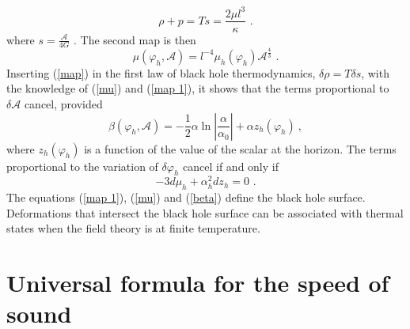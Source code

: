 \documentclass[11pt,epsf,letterpaper]{article}%
\begin{document}
\begin{equation}
\rho+p=Ts=\frac{2\mu l^{3}}{\kappa}\text{ .}%
\end{equation}
where $s=\frac{\mathcal{A}}{4G}$ . The second map is then%
\begin{equation}
\mu\left(  \varphi_{h},\mathcal{A}\right)  =l^{-4}\mu_{h}\left(  \varphi
_{h}\right)  \mathcal{A}^{\frac{4}{3}}\text{ .} \label{mu}%
\end{equation}
Inserting (\ref{map}) in the first law of black hole thermodynamics,
$\delta\rho=T\delta s$, with the knowledge of (\ref{mu}) and (\ref{map 1}), it
shows that the terms proportional to $\delta\mathcal{A}$ cancel, provided
\begin{equation}
\beta\left(  \varphi_{h},\mathcal{A}\right)  =-\frac{1}{2}\alpha\ln\left\vert
\frac{\alpha}{\alpha_{0}}\right\vert +\alpha z_{h}\left(  \varphi_{h}\right)
~, \label{beta}%
\end{equation}
where $z_{h}(\varphi_{h})$ is a function of the value of the scalar at the
horizon. The terms proportional to the variation of $\delta\varphi_{h}$ cancel
if and only if
\begin{equation}
-3d\mu_{h}+\alpha_{h}^{2}dz_{h}=0\text{ .} \label{mu0}%
\end{equation}
The equations (\ref{map 1}), (\ref{mu}) and (\ref{beta}) define the black hole
surface. Deformations that intersect the black hole surface can be associated
with thermal states when the field theory is at finite temperature.

\section{Universal formula for the speed of sound}
\end{document}

